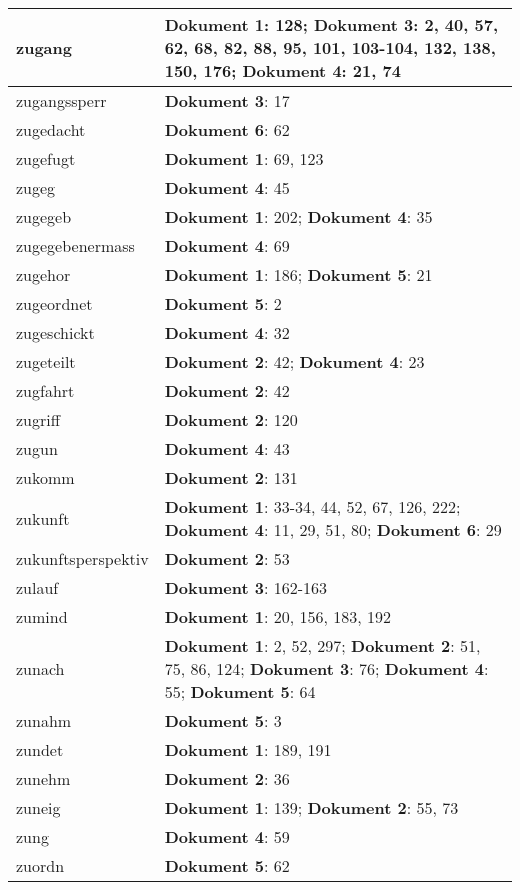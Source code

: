 \documentclass[a5paper]{article}
\begin{document}
\begin{longtable}[l]{|l|p{3in}|}
\hline
zugang & \textbf{Dokument 1}: 128; \textbf{Dokument 3}: 2, 40, 57, 62, 68, 82, 88, 95, 101, 103-104, 132, 138, 150, 176; \textbf{Dokument 4}: 21, 74 \\
\hline
zugangssperr & \textbf{Dokument 3}: 17 \\
\hline
zugedacht & \textbf{Dokument 6}: 62 \\
\hline
zugefugt & \textbf{Dokument 1}: 69, 123 \\
\hline
zugeg & \textbf{Dokument 4}: 45 \\
\hline
zugegeb & \textbf{Dokument 1}: 202; \textbf{Dokument 4}: 35 \\
\hline
zugegebenermass & \textbf{Dokument 4}: 69 \\
\hline
zugehor & \textbf{Dokument 1}: 186; \textbf{Dokument 5}: 21 \\
\hline
zugeordnet & \textbf{Dokument 5}: 2 \\
\hline
zugeschickt & \textbf{Dokument 4}: 32 \\
\hline
zugeteilt & \textbf{Dokument 2}: 42; \textbf{Dokument 4}: 23 \\
\hline
zugfahrt & \textbf{Dokument 2}: 42 \\
\hline
zugriff & \textbf{Dokument 2}: 120 \\
\hline
zugun & \textbf{Dokument 4}: 43 \\
\hline
zukomm & \textbf{Dokument 2}: 131 \\
\hline
zukunft & \textbf{Dokument 1}: 33-34, 44, 52, 67, 126, 222; \textbf{Dokument 4}: 11, 29, 51, 80; \textbf{Dokument 6}: 29 \\
\hline
zukunftsperspektiv & \textbf{Dokument 2}: 53 \\
\hline
zulauf & \textbf{Dokument 3}: 162-163 \\
\hline
zumind & \textbf{Dokument 1}: 20, 156, 183, 192 \\
\hline
zunach & \textbf{Dokument 1}: 2, 52, 297; \textbf{Dokument 2}: 51, 75, 86, 124; \textbf{Dokument 3}: 76; \textbf{Dokument 4}: 55; \textbf{Dokument 5}: 64 \\
\hline
zunahm & \textbf{Dokument 5}: 3 \\
\hline
zundet & \textbf{Dokument 1}: 189, 191 \\
\hline
zunehm & \textbf{Dokument 2}: 36 \\
\hline
zuneig & \textbf{Dokument 1}: 139; \textbf{Dokument 2}: 55, 73 \\
\hline
zung & \textbf{Dokument 4}: 59 \\
\hline
zuordn & \textbf{Dokument 5}: 62 \\

\end{longtable}
\end{document}
